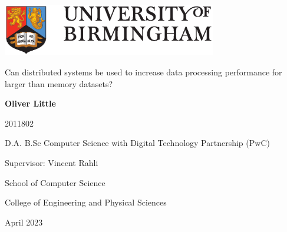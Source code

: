 \begin{titlepage}
	\begin{center}
		\vspace*{1cm}
		
		\includegraphics[width=0.7\textwidth]{uob-logo.eps}
		
		\vspace{1.5cm}
		
		\huge
		Can distributed systems be used to increase data processing performance for larger than memory datasets?
		
		
		
		\vspace{2cm}
		
		\large
		\textbf{Oliver Little}
		
		\vspace{0.25cm}
		
		\small 2011802
		
		\vspace{0.25cm}
		
		\large
		D.A. B.Sc Computer Science with Digital Technology Partnership (PwC)
		
		\vspace{2cm}
		
		Supervisor: Vincent Rahli
		
		\vspace{2cm}
		
		\large
		School of Computer Science
		
		\large
		College of Engineering and Physical Sciences
		
		\large
		April 2023
	\end{center}
\end{titlepage}